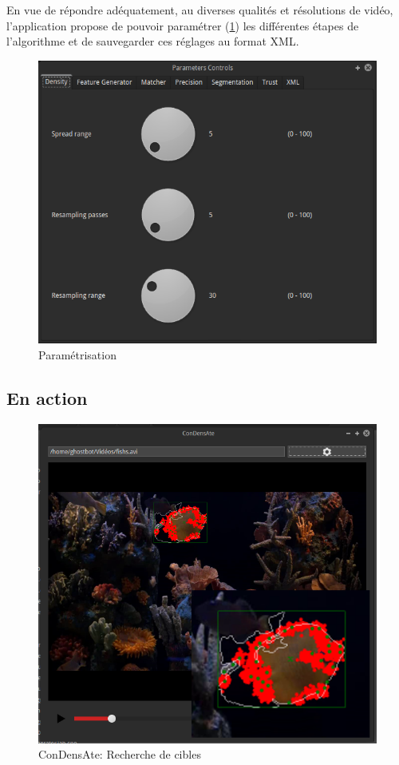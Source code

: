 \documentclass[a4paper,11pt]{report}
\begin{document}
En vue de répondre adéquatement, au diverses qualités et résolutions de vidéo, l'application propose de pouvoir paramétrer (\ref{fig:paramétrisation}) les différentes étapes de l'algorithme et de sauvegarder ces réglages au format XML.

\begin{figure}[H]
\centering
\includegraphics[scale=0.3]{screenshots/condensate5.png}
\caption{Paramétrisation}
\label{fig:paramétrisation}
\end{figure}

\pagebreak
\subsection{En action}

\begin{figure}[H]
\centering
\includegraphics[scale=0.45]{screenshots/condensate24.png}
\caption{ConDensAte: Recherche de cibles}
\label{SegmentationCible}
\end{figure}
\end{document}
